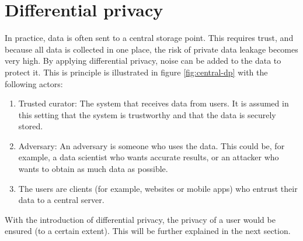 
\section{Differential privacy} \label{section:dp}
In practice, data is often sent to a central storage point.
This requires trust, and because all data is collected in one place, the risk of private data leakage becomes very high.
By applying differential privacy, noise can be added to the data to protect it.
This is principle is illustrated in figure \ref{fig:central-dp} with the following actors:
\begin{enumerate}
  \item Trusted curator: The system that receives data from users. It is assumed in this setting that the system is trustworthy and that the data is securely stored.
  \item Adversary: An adversary is someone who uses the data. This could be, for example, a data scientist who wants accurate results, or an attacker who wants to obtain as much data as possible.
  \item The users are clients (for example, websites or mobile apps) who entrust their data to a central server.
\end{enumerate}
With the introduction of differential privacy, the privacy of a user would be ensured (to a certain extent).
This will be further explained in the next section.

